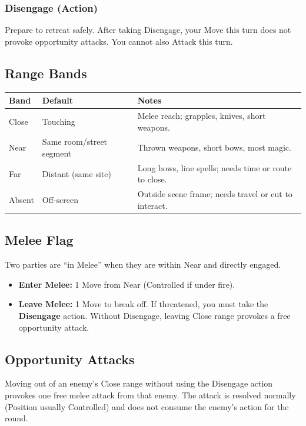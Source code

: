 \subsubsection{Disengage (Action)}
Prepare to retreat safely. After taking Disengage, your Move this turn does not provoke opportunity attacks. You cannot also Attack this turn.

\subsection{Range Bands}

\begin{tabular}{@{}llp{7cm}@{}}
\toprule
\textbf{Band} & \textbf{Default} & \textbf{Notes} \\
\midrule
Close & Touching & Melee reach; grapples, knives, short weapons. \\
Near & Same room/street segment & Thrown weapons, short bows, most magic. \\
Far & Distant (same site) & Long bows, line spells; needs time or route to close. \\
Absent & Off-screen & Outside scene frame; needs travel or cut to interact. \\
\bottomrule
\end{tabular}

\subsection{Melee Flag}

Two parties are ``in Melee'' when they are within Near and directly engaged.

\begin{itemize}
  \item \textbf{Enter Melee:} 1 Move from Near (Controlled if under fire).
  \item \textbf{Leave Melee:} 1 Move to break off. If threatened, you must take the \textbf{Disengage} action. Without Disengage, leaving Close range provokes a free opportunity attack.
\end{itemize}

\subsection{Opportunity Attacks}

Moving out of an enemy's Close range without using the Disengage action provokes one free melee attack from that enemy. The attack is resolved normally (Position usually Controlled) and does not consume the enemy's action for the round.

